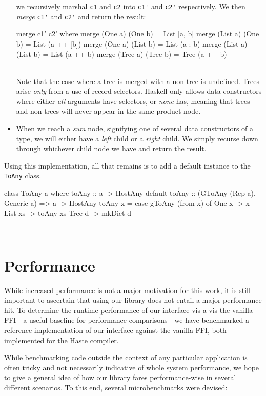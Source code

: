 \documentclass[preprint]{sigplanconf}
\begin{document}
\begin{itemize}
  we recursively marshal \lstinline!c1! and \lstinline!c2! into
  \lstinline!c1'! and \lstinline!c2'! respectively. We then \emph{merge}
  \lstinline!c1'! and \lstinline!c2'! and return the result:
  \begin{code}
    merge c1' c2'
      where
        merge (One a) (One b)   = List [a, b]
        merge (List a) (One b)  = List (a ++ [b])
        merge (One a) (List b)  = List (a : b)
        merge (List a) (List b) = List (a ++ b)
        merge (Tree a) (Tree b) = Tree (a ++ b)
  \end{code}\\
  Note that the case where a tree is merged with a non-tree is undefined.
  Trees arise \emph{only} from a use of record selectors. Haskell only
  allows data constructors where either \emph{all} arguments have selectors,
  or \emph{none} has, meaning that trees and non-trees will never appear in
  the same product node.
\item
  When we reach a \emph{sum} node, signifying one of several data constructors
  of a type, we will either have a \emph{left} child or a \emph{right} child.
  We simply recurse down through whichever child node we have and return the
  result.
\end{itemize}

Using this implementation, all that remains is to add a default instance to
the \lstinline!ToAny! class.\\
\begin{code}
  class ToAny a where
    toAny :: a -> HostAny
    default toAny :: (GToAny (Rep a), Generic a)
                  => a -> HostAny
    toAny x =
      case gToAny (from x) of
        One x   -> x
        List xs -> toAny xs
        Tree d  -> mkDict d
\end{code}\\
\section{Performance}
\label{sec:performance}
While increased performance is not a major motivation for this work, it is
still important to ascertain that using our library does not entail a major
performance hit. To determine the runtime performance of our interface
vis a vis the vanilla FFI - a useful baseline for performance comparisons - we
have benchmarked a reference implementation of our interface against the
vanilla FFI, both implemented for the Haste compiler.

While benchmarking code outside the context of any particular application is
often tricky and not necessarily indicative of whole system performance,
we hope to give a general idea of how our library fares performance-wise in
several different scenarios.
To this end, several microbenchmarks were devised:
\end{document}
